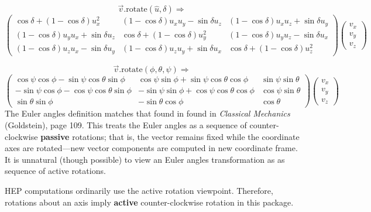\[  \vec{v}.\mbox{rotate}(\hat{u},\delta) \Longrightarrow \]
\begin{equation}
\label{eq:axisrot}
\left(
\begin{array}{ccc}
\cos \delta + (1 - \cos \delta ) u_x^2 &
(1 - \cos \delta ) u_x u_y - \sin \delta u_z &
(1 - \cos \delta ) u_x u_z + \sin \delta u_y \\
(1 - \cos \delta ) u_y u_x + \sin \delta u_z &
\cos \delta + (1 - \cos \delta ) u_y^2 &
(1 - \cos \delta ) u_y u_z - \sin \delta u_x \\
(1 - \cos \delta ) u_z u_x - \sin \delta u_y &
(1 - \cos \delta ) u_z u_y + \sin \delta u_x &
\cos \delta + (1 - \cos \delta ) u_z^2
\end{array}
\right)
\left(
\begin{array}{c}
v_x\\
v_y\\
v_z
\end{array}
\right)
\end{equation}

\[  \vec{v}.\mbox{rotate}(\phi, \theta, \psi) \Longrightarrow  \]
\begin{equation}
\label{eq:eulerrot}
\left(
\begin{array}{ccc}
\cos \psi \cos \phi - \sin \psi \cos \theta \sin \phi &
\cos \psi \sin \phi + \sin \psi \cos \theta \cos \phi &
\sin \psi \sin \theta \\
- \sin \psi \cos \phi - \cos \psi \cos \theta \sin \phi &
- \sin \psi \sin \phi + \cos \psi \cos \theta \cos \phi &
\cos \psi \sin \theta \\
\sin \theta \sin \phi &
- \sin \theta \cos \phi &
\cos \theta
\end{array}
\right)
\left(
\begin{array}{c}
v_x\\
v_y\\
v_z
\end{array}
\right)
\end{equation}
\noindent
The Euler angles definition matches that found in found in
{\em Classical Mechanics} (Goldstein), page 109.
This treats the Euler angles as a sequence of counter-clockwise {\bf passive}
rotations;
that is, the vector remains fixed while the coordinate axes are rotated---new
vector components are computed in new coordinate frame.
It is unnatural (though possible) to view an Euler angles transformation as
as sequence of active rotations.

HEP computations ordinarily use the active rotation viewpoint.
Therefore, rotations about an axis imply {\bf active} counter-clockwise
rotation in this package. 

